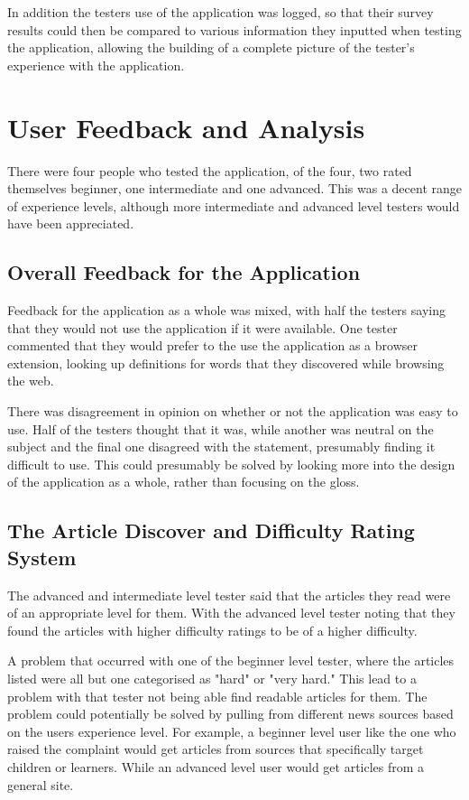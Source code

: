 In addition the testers use of the application was logged, so that their survey results could then be compared to various information they inputted when testing the application, allowing the building of a complete picture of the tester's experience with the application. 

\section{User Feedback and Analysis}

There were four people who tested the application, of the four, two rated themselves beginner, one intermediate and one advanced. This was a decent range of experience levels, although more intermediate and advanced level testers would have been appreciated.

\subsection{Overall Feedback for the Application}

Feedback for the application as a whole was mixed, with half the testers saying that they would not use the application if it were available. One tester commented that they would prefer to the use the application as a browser extension, looking up definitions for words that they discovered while browsing the web.

There was disagreement in opinion on whether or not the application was easy to use. Half of the testers thought that it was, while another was neutral on the subject and the final one disagreed with the statement, presumably finding it difficult to use. This could presumably be solved by looking more into the design of the application as a whole, rather than focusing on the gloss.


\subsection{The Article Discover and Difficulty Rating System}

The advanced and intermediate level tester said that the articles they read were of an appropriate level for them. With the advanced level tester noting that they found the articles with higher difficulty ratings to be of a higher difficulty. 

A problem that occurred with one of the beginner level tester, where the articles listed were all but one categorised as "hard" or "very hard." This lead to a problem with that tester not being able find readable articles for them. The problem could potentially be solved by pulling from different news sources based on the users experience level. For example, a beginner level user like the one who raised the complaint would get articles from sources that specifically target children or learners. While an advanced level user would get articles from a general site.

